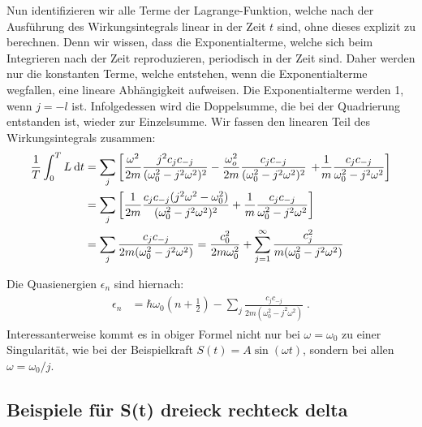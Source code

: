        Nun identifizieren wir alle Terme der Lagrange-Funktion, welche nach der Ausführung des Wirkungsintegrals linear in der Zeit $t$ sind, ohne dieses explizit zu berechnen.
       Denn wir wissen, dass die Exponentialterme, welche sich beim Integrieren nach der Zeit reproduzieren, periodisch in der Zeit sind.
       Daher werden nur die konstanten Terme, welche entstehen, wenn die Exponentialterme wegfallen, eine lineare Abhängigkeit aufweisen.
       Die Exponentialterme werden 1, wenn $j=-l$ ist.
       Infolgedessen wird die Doppelsumme, die bei der Quadrierung entstanden ist, wieder zur Einzelsumme.
       Wir fassen den linearen Teil des Wirkungsintegrals zusammen:
       \begin{align}
         \begin{split}
           \frac{1}{T} \int_0^T L \: \text d t
           &= \sum_j \left[\frac{\omega^2}{2m} \frac{j^2c_jc_{-j}}{(\omega_0^2-j^2\omega^2)^2}
           - \frac{\omega_o^2}{2m} \frac{c_jc_{-j}}{(\omega_0^2-j^2\omega^2)^2} \right.
           \left. +\frac{1}{m} \frac{c_jc_{-j}}{\omega_0^2-j^2\omega^2}
           \right]\\
           &= \sum_j \left[\frac{1}{2m} \frac{c_jc_{-j}(j^2\omega^2-\omega_0^2)}{(\omega_0^2-j^2\omega^2)^2} + \frac{1}{m} \frac{c_jc_{-j}}{\omega_0^2-j^2\omega^2} \right] \\
           &= \sum_j \frac{c_jc_{-j}}{2m(\omega_0^2-j^2\omega^2)} = \frac{c_0^2}{2m\omega_0^2} + \sum_{j=1}^\infty \frac{c_j^2}{m(\omega_0^2-j^2\omega^2)}
         \end{split}
       \end{align}

       Die Quasienergien $\epsilon_n$ sind hiernach:
       \begin{align}
         \begin{split}
           \epsilon_n &= \hbar \omega_0\left(n+\frac{1}{2}\right) - \sum_j \frac{c_jc_{-j}}{2m(\omega_0^2-j^2\omega^2)} \; .
         \end{split}
       \end{align}
       Interessanterweise kommt es in obiger Formel nicht nur bei $\omega = \omega_0$ zu einer Singularität, wie bei der Beispielkraft $S(t) = A\sin(\omega t)$, sondern bei allen $\omega = \omega_0 / j$.



       \subsection{Beispiele für S(t) dreieck rechteck delta}

